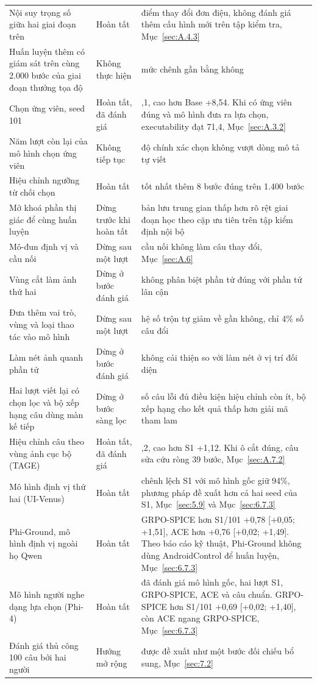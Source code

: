 {\begin{longtable}{@{}>{\raggedright\arraybackslash}p{}>{\raggedright\arraybackslash}p{}>{\raggedright\arraybackslash}p{}@{}}
Nội suy trọng số giữa hai giai đoạn trên & Hoàn tất & điểm thay đổi đơn điệu, không đánh giá thêm cấu hình mới trên tập kiểm tra, Mục~\ref{sec:A.4.3} \\
Huấn luyện thêm có giám sát trên cùng 2.000 bước của giai đoạn thưởng tọa độ & Không thực hiện & mức chênh gần bằng không \\
Chọn ứng viên, seed 101 & Hoàn tất, đã đánh giá & 56,1, cao hơn Base +8,54. Khi có ứng viên đúng và mô hình đưa ra lựa chọn, executability đạt 71,4, Mục~\ref{sec:A.3.2} \\
Năm lượt còn lại của mô hình chọn ứng viên & Không tiếp tục & độ chính xác chọn không vượt dòng mô tả tự viết \\
Hiệu chỉnh ngưỡng từ chối chọn & Hoàn tất & tốt nhất thêm 8 bước đúng trên 1.400 bước \\
Mở khoá phần thị giác để cùng huấn luyện & Dừng trước khi hoàn tất & bản lưu trung gian thấp hơn rõ rệt giai đoạn học theo cặp ưu tiên trên tập kiểm định nội bộ \\
Mô-đun định vị và cầu nối & Dừng sau một lượt & cầu nối không làm câu thay đổi, Mục~\ref{sec:A.6} \\
Vùng cắt làm ảnh thứ hai & Dừng ở bước đánh giá & không phân biệt phần tử đúng với phần tử lân cận \\
Đưa thêm vai trò, vùng và loại thao tác vào mô hình & Dừng sau một lượt & hệ số trộn tự giảm về gần không, chỉ 4\% số câu đổi \\
Làm nét ảnh quanh phần tử & Dừng ở bước đánh giá & không cải thiện so với làm nét ở vị trí đối diện \\
Hai lượt viết lại có chọn lọc và bộ xếp hạng câu dùng màn kế tiếp & Dừng ở bước sàng lọc & số câu lỗi đủ điều kiện hiệu chỉnh còn ít, bộ xếp hạng cho kết quả thấp hơn giải mã tham lam \\
Hiệu chỉnh câu theo vùng ảnh cục bộ (TAGE) & Hoàn tất, đã đánh giá & 60,2, cao hơn S1 +1,12. Khi ô cắt đúng, câu sửa cứu ròng 39 bước, Mục~\ref{sec:A.7.2} \\
Mô hình định vị thứ hai (UI-Venus) & Hoàn tất & chênh lệch S1 với mô hình gốc giữ 94\%, phương pháp đề xuất hơn cả hai seed của S1, Mục~\ref{sec:5.9} và Mục~\ref{sec:6.7.3} \\
Phi-Ground, mô hình định vị ngoài họ Qwen & Hoàn tất & GRPO-SPICE hơn S1/101 +0,78 [+0,05; +1,51], ACE hơn +0,76 [+0,02; +1,49]. Theo báo cáo kỹ thuật, Phi-Ground không dùng AndroidControl để huấn luyện, Mục~\ref{sec:6.7.3} \\
Mô hình người nghe dạng lựa chọn (Phi-4) & Hoàn tất & đã đánh giá mô hình gốc, hai lượt S1, GRPO-SPICE, ACE và câu chuẩn. GRPO-SPICE hơn S1/101 +0,69 [+0,02; +1,40], còn ACE ngang GRPO-SPICE, Mục~\ref{sec:6.7.3} \\
Đánh giá thủ công 100 câu bởi hai người & Hướng mở rộng & được đề xuất như một bước đối chiếu bổ sung, Mục~\ref{sec:7.2} \\
\end{longtable}
}

